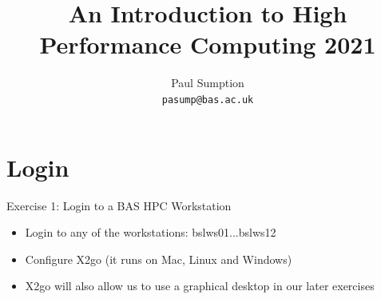 \documentclass[handout]{beamer} %
\title[British Antarctic Survey] %
{An Introduction to High Performance Computing 2021}
\author[Paul Sumption]%
{Paul Sumption\\ \texttt{pasump@bas.ac.uk}}
\begin{document}
{
%
\begin{frame}
\titlepage
\end{frame}
}

{
\section{Login}
%
\begin{frame}{Exercise 1: Login to a BAS HPC Workstation}
\begin{itemize}
\item Login to any of the workstations: bslws01...bslws12 
\item Configure X2go (it runs on Mac, Linux and Windows) 
\item X2go will also allow us to use a graphical desktop in our later exercises
\end{itemize}
\end{frame}
}
\end{document}
